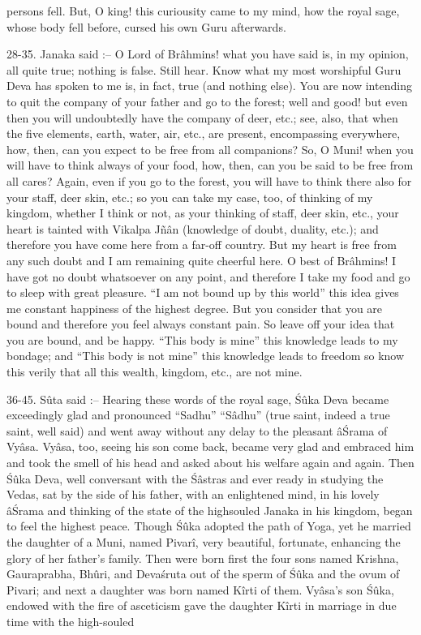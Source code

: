 persons fell. But, O king! this curiousity came to my mind, how the royal sage, whose body fell before, cursed his own Guru afterwards.

28-35. Janaka said :-- O Lord of Br\^ahmins! what you have said is, in my opinion, all quite true; nothing is false. Still hear. Know what my most worshipful Guru Deva has spoken to me is, in fact, true (and nothing else). You are now intending to quit the company of your father and go to the forest; well and good! but even then you will undoubtedly have the company of deer, etc.; see, also, that when the five elements, earth, water, air, etc., are present, encompassing everywhere, how, then, can you expect to be free from all companions? So, O Muni! when you will have to think always of your food, how, then, can you be said to be free from all cares? Again, even if you go to the forest, you will have to think there also for your staff, deer skin, etc.; so you can take my case, too, of thinking of my kingdom, whether I think or not, as your thinking of staff, deer skin, etc., your heart is tainted with Vikalpa Jñ\^an (knowledge of doubt, duality, etc.); and therefore you have come here from a far-off country. But my heart is free from any such doubt and I am remaining quite cheerful here. O best of Br\^ahmins! I have got no doubt whatsoever on any point, and therefore I take my food and go to sleep with great pleasure. ``I am not bound up by this world'' this idea gives me constant happiness of the highest degree. But you consider that you are bound and therefore you feel always constant pain. So leave off your idea that you are bound, and be happy. ``This body is mine'' this knowledge leads to my bondage; and ``This body is not mine'' this knowledge leads to freedom so know this verily that all this wealth, kingdom, etc., are not mine.

36-45. S\^uta said :-- Hearing these words of the royal sage, \'S\^uka Deva became exceedingly glad and pronounced ``Sadhu'' ``S\^adhu'' (true saint, indeed a true saint, well said) and went away without any delay to the pleasant \^a\'Srama of Vy\^asa. Vy\^asa, too, seeing his son come back, became very glad and embraced him and took the smell of his head and asked about his welfare again and again. Then \'S\^uka Deva, well conversant with the \'S\^astras and ever ready in studying the Vedas, sat by the side of his father, with an enlightened mind, in his lovely \^a\'Srama and thinking of the state of the highsouled Janaka in his kingdom, began to feel the highest peace. Though \'S\^uka adopted the path of Yoga, yet he married the daughter of a Muni, named Pivar\^i, very beautiful, fortunate, enhancing the glory of her father's family. Then were born first the four sons named Krishna, Gauraprabha, Bh\^uri, and Deva\'sruta out of the sperm of \'S\^uka and the ovum of Pivari; and next a daughter was born named K\^irti of them. Vy\^asa's son \'S\^uka, endowed with the fire of asceticism gave the daughter K\^irti in marriage in due time with the high-souled

